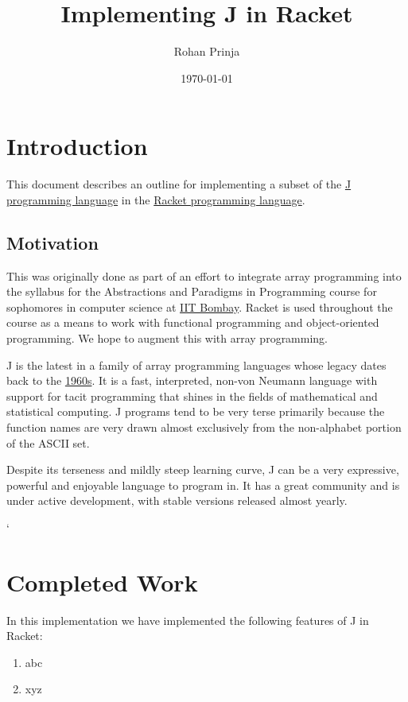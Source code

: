 \documentclass[a4paper,9pt]{article}
\title{Implementing J in Racket}
\author{Rohan Prinja}
\date{\today}
\begin{document}
\maketitle

\section{Introduction}
This document describes an outline for implementing a subset of the \href{http://jsoftware.com}{J programming language} in the \href{http://racket-lang.org}{Racket programming language}.

\subsection{Motivation}
This was originally done as part of an effort to integrate array programming into the syllabus for the Abstractions and Paradigms in Programming course for sophomores in computer science at \href{http://www.iitb.ac.in}{IIT Bombay}. Racket is used throughout the course as a means to work with functional programming and object-oriented programming. We hope to augment this with array programming.

J is the latest in a family of array programming languages whose legacy dates back to the \href{http://en.wikipedia.org/wiki/APL\_(programming_language)‎}{1960s}. It is a fast, interpreted, non-von Neumann language with support for tacit programming that shines in the fields of mathematical and statistical computing. J programs tend to be very terse  primarily because the function names are very drawn almost exclusively from the non-alphabet portion of the ASCII set.

Despite its terseness and mildly steep learning curve, J can be a very expressive, powerful and enjoyable language to program in. It has a great community and is under active development, with stable versions released almost yearly.

`
\section{Completed Work}
In this implementation we have implemented the following features of J in Racket:
\begin{enumerate}
	\item abc
	\item xyz
\end{enumerate}
\end{document}
